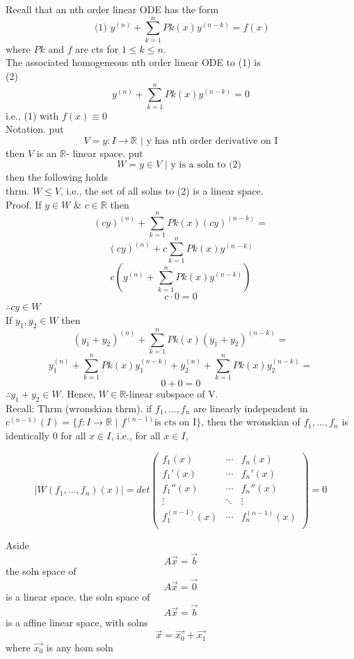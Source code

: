 \documentclass[10pt,a4paper]{article}
\begin{document}
  \newpage
  Recall that an nth order linear ODE has the form 
  \[ \text{ (1) } y^{(n)} + \sum_{k=1}^n Pk(x)y^{(n-k)} = f(x)\]
  where \( Pk \) and \( f \) are cts for \( 1 \leq k \leq n \). \\
  The associated homogeneous nth order linear ODE to (1) is\\
  (2)
  \[ y^{(n)} + \sum_{k=1}^n Pk(x)y^{(n-k)} = 0 \]
  i.e., (1) with \( f(x) \equiv 0 \)\\
  Notation. put 
  \[ V = { y: I \to \mathbb{R} \text{ |  y has nth order derivative on I}  } \]
  then \( V \) is an \( \mathbb{R} \)- linear space. put 
  \[ W =  { y \in V \text{ | y is a soln to (2) }  } \]
  then the following holds\\[5mm]
  thrm. \( W \leq V \), i.e., the set of all solns to (2) is a linear
  space. \\
  Proof. If \( y \in W \) \& \( c \in \mathbb{R} \) then 
  \[ (cy)^{(n)} + \sum_{k=1}^n Pk(x)(cy)^{(n-k)}  = \]
  \[ (cy)^{(n)} + c\sum_{k=1}^n Pk(x)y^{(n-k)} \]
  \[ c(y^{(n)} + \sum_{k=1}^n Pk(x)y^{(n-k)}) \]
  \[ c \cdot 0 = 0 \]
  \( \therefore cy\in W \) \\
  If \( y_1, y_2 \in W \) then 
  \[ (y_1 + y_2)^{(n)} + \sum_{k=1}^n Pk(x)(y_1 +y_2 )^{(n-k)} = \]
  \[ y_1^{(n)} + \sum_{k=1}^n Pk(x)y_1^{(n-k)} + y_2^{(n)} +
  \sum_{k=1}^n Pk(x)y_2^{(n-k)} = \]
  \[ 0 + 0 = 0  \]
  \( \therefore y_1 + y_2 \in W \). Hence, \( W \in \mathbb{R} \)-linear
  subspace of V. \\[5mm]
  Recall: 
  Thrm (wronskian thrm). if \( f_1, ..., f_n \) are linearly independent
  in \( c^{(n-1)} (I) = \{ f:I\to \mathbb{R} \text{ | } f^{(n-1)} \text{
  is cts on I} \} \), then the wronskian of \( f_1, ..., f_n \) is identically 0
  for all \( x \in I \), i.e., for all \( x \in I \), 

  \[ |W(f_1, ...,f_n)(x)|  = det 
  \begin{pmatrix} 
    f_1(x)         & \cdots & f_n(x) \\
    f_1'(x)        & \cdots & f_n'(x) \\
    f_1''(x)       & \cdots & f_n''(x) \\
    \vdots         & \ddots & \vdots\\
    f_1^{(n-1)}(x) & \cdots & f_n^{(n-1)}(x) \\
  \end{pmatrix}
  =0\]


  Aside
  \[ A \vec{x}  = \vec{b} \]
  the soln space of 
  \[ A \vec{x} =\vec{0} \]
  is a linear space. the soln space of 
  \[ A \vec{x}  = \vec{b} \]
  is a affine linear space, with solns 
  \[ \vec{x} = \vec{x_0} + \vec{x_1}\]
  where \( \vec{x_0} \) is any hom soln
\end{document}
